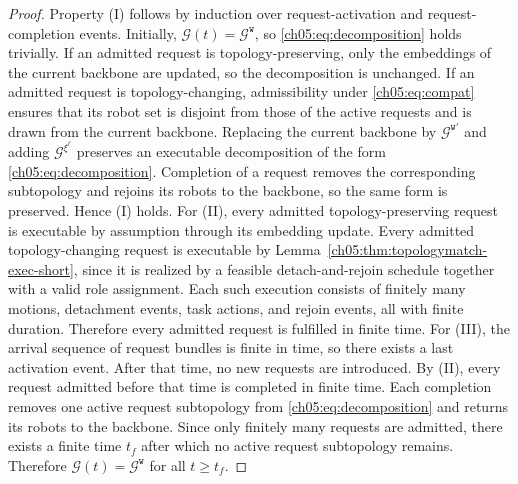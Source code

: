 \begin{proof}
Property (I) follows by induction over request-activation and
request-completion events. Initially,
\(\mathcal{G}(t)=\mathcal{G}^{\texttt{w}}\), so
\eqref{ch05:eq:decomposition} holds trivially. If an admitted request
is topology-preserving, only the embeddings of the current backbone are
updated, so the decomposition is unchanged. If an admitted request is
topology-changing, admissibility under \eqref{ch05:eq:compat} ensures
that its robot set is disjoint from those of the active requests and is
drawn from the current backbone.  Replacing the current backbone by
\(\mathcal{G}^{\texttt{w}'}\) and adding
\(\mathcal{G}^{\xi^{\ell}}\) preserves an executable decomposition of
the form \eqref{ch05:eq:decomposition}. Completion of a request removes
the corresponding subtopology and rejoins its robots to the backbone,
so the same form is preserved. Hence (I) holds.
For (II), every admitted topology-preserving request is executable by
assumption through its embedding update. Every admitted
topology-changing request is executable by
Lemma~\ref{ch05:thm:topologymatch-exec-short}, since it is realized by
a feasible detach-and-rejoin schedule together with a valid role
assignment. Each such execution consists of finitely many motions,
detachment events, task actions, and rejoin events, all with finite
duration. Therefore every admitted request is fulfilled in finite time.
For (III), the arrival sequence of request bundles is finite in time,
so there exists a last activation event. After that time, no new
requests are introduced. By (II), every request admitted before that
time is completed in finite time. Each completion removes one active
request subtopology from \eqref{ch05:eq:decomposition} and returns its
robots to the backbone. Since only finitely many requests are admitted,
there exists a finite time \(t_f\) after which no active request
subtopology remains. Therefore
\(\mathcal{G}(t)=\mathcal{G}^{\texttt{w}}\) for all \(t\ge t_f\).
\end{proof}
